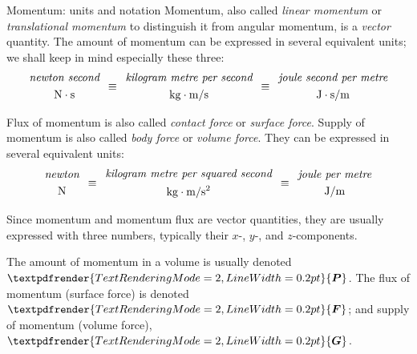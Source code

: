 \documentclass[a4paper,12pt,%
onecolumn,oneside,%
british%
]{memoir}
\renewcommand*{\bm}[1]{\textpdfrender{TextRenderingMode=2,LineWidth=0.2pt}{\boldsymbol{#1}}}
\renewcommand*{\|}[1][]{\nonscript\:#1\vert\nonscript\:\mathopen{}}
\newcommand*{\yP}{\bm{P}}
\newcommand*{\yF}{\bm{F}}
\newcommand*{\yG}{\bm{G}}
\begin{document}
\begin{definition}{Momentum: units and notation}
  Momentum, also called \emph{linear momentum} or \emph{translational momentum} to distinguish it from angular momentum, is a \emph{vector} quantity. The amount of momentum can be expressed in several equivalent units; we shall keep in mind especially these three:
  \begin{equation*}
    \begin{gathered}
      \textit{newton second}\\
      \unit{N\cdot s}
    \end{gathered}
\enskip\equiv\enskip
    \begin{gathered}
      \textit{kilogram metre per second}\\
      \unit{kg\cdot m/s}
    \end{gathered}
\enskip\equiv\enskip
    \begin{gathered}
      \textit{joule second per metre}\\
      \unit{J\cdot s/m}
    \end{gathered}
\end{equation*}

\smallskip

Flux of momentum is also called \emph{contact force} or \emph{surface force}. Supply of momentum is also called \emph{body force} or \emph{volume force}. They can be expressed in several equivalent units:
\begin{equation*}
    \begin{gathered}
      \textit{newton}\\
      \unit{N}
    \end{gathered}
\enskip\equiv\enskip
    \begin{gathered}
      \textit{kilogram metre per squared second}\\
      \unit{kg\cdot m/s^{2}}
    \end{gathered}
\enskip\equiv\enskip
    \begin{gathered}
      \textit{joule per metre}\\
      \unit{J/m}
    \end{gathered}
\end{equation*}

Since momentum and momentum flux are vector quantities, they are usually expressed with three numbers, typically their $x$-, $y$-, and $z$-components.

\smallskip

The amount of momentum in a volume is usually denoted $\yP$. The flux of momentum (surface force) is denoted $\yF$; and supply of momentum (volume force), $\yG$.
\end{definition}
\end{document}
